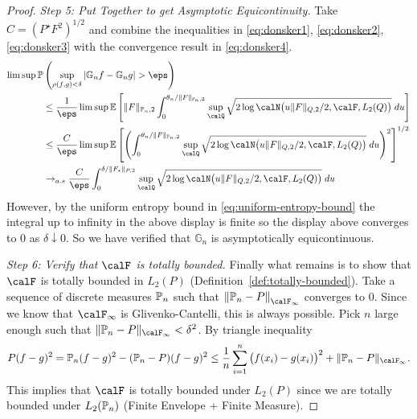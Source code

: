 \begin{proof}
	\textit{Step 5: Put Together to get Asymptotic Equicontinuity.} Take \(C = (P^\star F^2)^{1/2}\) and combine the inequalities in  \eqref{eq:donsker1}, \eqref{eq:donsker2}, \eqref{eq:donsker3} with the convergence result in  \eqref{eq:donsker4}.
	\begin{align*}
		\lim\sup\P&\left(\sup_{\rho(f,g)<\delta}\left|\mathbb{G}_nf-\mathbb{G}_ng\right|>\eps\right) \\
		&\leq \frac{1}{\eps}\lim\sup\E\left[ \|F\|_{\P_n,2}\int_{0}^{\theta_n/\|F\|_{\P_n,2}}\sup_{\calQ}\sqrt{2\log\calN\big(u\|F\|_{Q,2}/2,\calF,L_2(Q)\big)}\;du \right] \\
		&\leq \frac{C}{\eps}\lim\sup\E\left[\left( \int_{0}^{\theta_n/\|F\|_{\P_n,2}} \sup_{\calQ}\sqrt{2\log\calN\big(u\|F\|_{Q,2}/2,\calF,L_2(Q)\big)}\;du\right)^2\right]^{1/2}\\
		&\to_{a.s} \frac{C}{\eps}\int_{0}^{\delta/\|F_\star\|_{P,2}} \sup_{\calQ}\sqrt{2\log\calN\big(u\|F\|_{Q,2}/2,\calF,L_2(Q)\big)}\;du
	\end{align*}
	However, by the uniform entropy bound in \eqref{eq:uniform-entropy-bound} the integral up to infinity in the above display is finite so the display above converges to 0 as \(\delta\downarrow 0\). So we have verified that  \(\mathbb{G}_n\) is asymptotically equicontinuous.

	\textit{Step 6: Verify that \(\calF\) is totally bounded.} Finally what remains is to show that \(\calF\) is totally bounded in  \(L_2(P)\) (Definition~\ref{def:totally-bounded}). Take a sequence of discrete measures \(\P_n\) such that  \(\left\|\P_n-P\right\|_{\calF_\infty}\) converges to 0. Since we know that \(\calF_\infty\) is Glivenko-Cantelli, this is always possible. Pick \(n\) large enough such that  \(\|\P_n-P\|_{\calF_\infty} < \delta^2\). By triangle inequality
	\[
		P(f-g)^2 = \P_n(f-g)^2 - (\P_n-P)(f-g)^2\leq \frac{1}{n}\sum_{i=1}^n \left(f(x_i)-g(x_i)\right)^2 + \|\P_n-P\|_{\calF_\infty} 
	.\]
	This implies that \(\calF\) is totally bounded under  \(L_2(P)\) since we are totally bounded under  \(L_2(\P_n)\) (Finite Envelope + Finite Measure).	
\end{proof}

